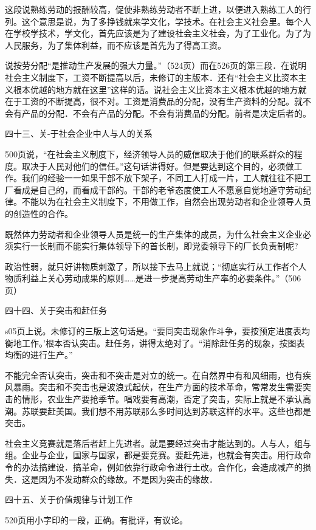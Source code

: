 这段说熟练劳动的报酬较高，促使非熟练劳动者不断上进，以便进入熟练工人的行列。这个意思是说，为了多挣钱就来学文化，学技术。在社会主义社会里。每个人在学校学技术，学文化，首先应该是为了建设社会主义社会，为了工业化。为了为人民服务，为了集体利益，而不应该是首先为了得高工资。

说按劳分配“是推动生产发展的强大力量。”（524页）而在526页的第三段．在说明社会主义制度下，工资不断提高以后，未修订的主版本．还有“社会主义比资本主义根本优越的地方就在这里”这样的话。说社会主义比资本主义根本优越的地方就在于工资的不断提高，很不对。工资是消费品的分配，没有生产资料的分配。就不会有产品的分配．不会有产品的分配。不会有消费品的分配。前者是决定后者的。

四十三、关-于社会企业中人与人的关系

500页说，“在社会主义制度下，经济领导人员的威信取决于他们的联系群众的程度。取决于人民对他们的信任。”这句话讲得好。但是要达到这个目的，必须做工作。我们的经验一一如果干部不放下架子，不同工人打成一片，工人就往往不把工厂看成是自己的，而看成干部的。干部的老爷态度使工人不愿意自觉地遵守劳动纪律。不能以为在社会主义制度下，不用做工作，自然会出现劳动者和企业领导人员的创造性的合作。

既然体力劳动者和企业领导人员是统一的生产集体的成员，为什么社会主义企业必须实行一长制而不能实行集体领导下的首长制，即党委领导下的厂长负责制呢?

政治性弱，就只好讲物质刺激了，所以接下去马上就说；“彻底实行从工作者个人物质利益上关心劳动成果的原则……是进一步提高劳动生产率的必要条件。”（506页）

四十四、关于突击和赶任务

s05页上说。未修订的三版上这句话是。“要同突击现象作斗争，要按预定进度表均衡地工作。’根本否认突击。赶任务，讲得太绝对了。“消除赶任务的现象，按图表均衡的进行生产。”

不能完全否认突击，突击和不突击是对立的统一。在自然界中有和风细雨，也有疾风暴雨。突击和不突击也是波浪式起伏，在生产方面的技术革命，常常发生需要突击的情形，农业生产要抢季节。唱戏要有高潮，否定了突击，实际上就是不承认高潮。苏联要赶美国。我们想不用苏联那么多时间达到苏联这样的水平。这些也都是突击。

社会主义竞赛就是落后者赶上先进者。就是要经过突击才能达到的。人与人，组与组。企业与企业，国家与国家，都是要竞赛。要赶先进，也就会有突击。用行政命令的办法搞建设．搞革命，例如依靠行政命令进行土改。合作化，会造成减产的损失．这是因为不发动群众的缘故。不是因为突击的缘故．

四十五、关于价值规律与计划工作

520页用小字印的一段，正确。有批评，有议论。

